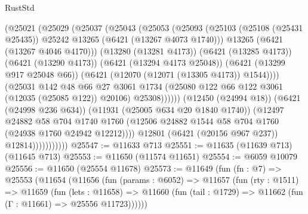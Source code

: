 \begin{lexlean}{RustStd}
\begin{coremodule}
                                (@25021
                                  (@25029
                                    (@25037
                                      (@25043
                                        (@25053
                                          (@25093
                                            (@25103
                                              (@25108 (@25431 @25435))
                                              @25242
                                              @13265
                                              (@6421 (@13267 @4073 @1740)))
                                            @13265
                                            (@6421 (@13267 @4046 @4170)))
                                          (@13280 (@13281 @4173))
                                          (@6421 (@13285 @4173))
                                          (@6421 (@13290 @4173))
                                          (@6421 (@13294 @4173 @25048))
                                          (@6421 (@13299 @917 @25048 @66))
                                          (@6421 (@12070 (@12071 (@13305 @4173)) @1544))))
                                      (@25031
                                        @142
                                        @48
                                        @66
                                        @27
                                        @3061
                                        @1734
                                        (@25080 @122 @66 @122 @3061 (@12035 (@25085 @122)) @20106)
                                        @25308))))))
                            (@12450 (@24994 @18))
                            (@6421 (@24998 @236 @634))
                            (@11931 (@25005 @634 @20 @1840 @1740))
                            (@12497
                              @24882
                              @58
                              @704
                              @1740
                              @1760
                              (@12506 @24882 @1544 @58 @704 @1760 (@24938 @1760 @24942 @12212))))
                          @12801
                          (@6421 (@20156 @967 @237))
                          @12814)))))))))))
@25547 := @11633 @713
@25551 := @11635 (@11639 @713) (@11645 @713)
@25553 := @11650 (@11574 @11651)
@25554 := @6059 @10079
@25556 := @11650 (@25554 @11678)
@25573 := @11649
    (fun (fn : @7) =>
    @25553
      (@11654
        (@11656
          (fun (params : @6052) =>
          @11657
            (fun (rty : @1511) =>
            @11659
              (fun (lets : @11658) =>
              @11660 (fun (tail : @1729) => @11662 (fun (Γ : @11661) => @25556 @11723))))))

\end{coremodule}
\end{lexlean}
